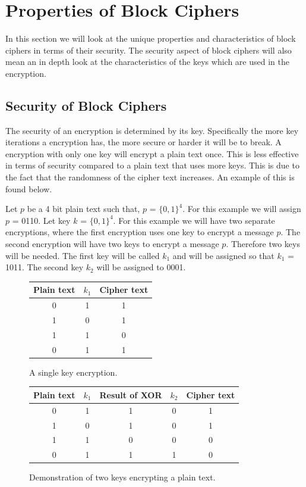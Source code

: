 \documentclass[11pt,a4paper, notitlepage]{report}
\begin{document}
\section{Properties of Block Ciphers}
\label{sec:CharpropBC}

In this section we will look at the unique properties and characteristics of block ciphers in terms of their security. The security aspect of block ciphers will also mean an in depth look at the characteristics of the keys which are used in the encryption. 

\subsection{Security of Block Ciphers}
\label{subsec:SecurityBC}

The security of an encryption is determined by its key. Specifically the more key iterations a encryption has, the more secure or harder it will be to break. A encryption with only one key will encrypt a plain text once. This is less effective in terms of security compared to a plain text that uses more keys. This is due to the fact that the randomness of the cipher text increases. An example of this is found below. 

Let $p$ be a 4 bit plain text such that, $p$ = $\{0,1\}^{4}$. For this example we will assign $p$ = 0110. Let key $k$ = $\{0,1\}^{4}$. For this example we will have two separate encryptions, where the first encryption uses one key to encrypt a message $p$. The second encryption will have two keys to encrypt a message $p$. Therefore two keys will be needed. The first key will be called $k_{1}$ and will be assigned so that $k_{1}$ = 1011. The second key $k_{2}$ will be assigned to 0001.   

\begin{figure}[H]
\centering

\begin{tabular}{|c|c|c|}
\hline
Plain text & $k_{1}$   & Cipher text\\ \hline
0 & 1 & 1 \\ \hline
1 & 0 & 1 \\ \hline
1 & 1 & 0 \\ \hline
0 & 1 & 1 \\ \hline
\end{tabular}
\caption{A single key encryption.}

\end{figure}
\begin{figure}[H]
\centering
\begin{tabular}{|c|c|c|c|c|}
\hline
Plain text & $k_{1}$ & Result of XOR & $k_{2}$ & Cipher text\\ \hline
0 & 1 & 1 & 0 & 1 \\ \hline
1 & 0 & 1 & 0 & 1 \\ \hline
1 & 1 & 0 & 0 & 0 \\ \hline
0 & 1 & 1 & 1 & 0 \\ \hline
\end{tabular}
\caption{Demonstration of two keys encrypting a plain text.}
\end{figure}
\end{document}
